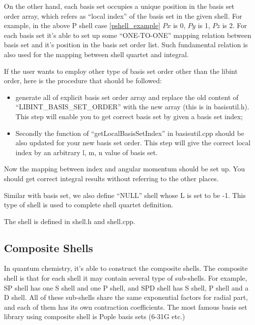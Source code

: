 On the other hand, each basis set occupies a unique position in the 
basis set order array, which refers as ``local index'' of the 
basis set in the given shell. For example, in the above P shell
case \ref{pshell_example} $Px$ is 0, $Py$ is 1, $Pz$ is 2. For 
each basis set it's able to set up some ``ONE-TO-ONE'' mapping 
relation between basis set and it's position in the basis set 
order list. Such fundamental relation is also used for the 
mapping between shell quartet and integral.

If the user wants to employ other type of basis set order other 
than the libint order, here is the procedure that should be 
followed:
\begin{itemize}
 \item generate all of explicit basis set order array and 
	 replace the old content of ``LIBINT\_BASIS\_SET\_ORDER''
	 with the new array (this is in basisutil.h). This step
	 will enable you to get correct basis set by given 
	 a basis set index;
 \item Secondly the function of ``getLocalBasisSetIndex'' in
	 basisutil.cpp should be also updated for your new basis 
	 set order. This step will give the correct local index
	 by an arbitrary l, m, n value of basis set.
\end{itemize}
Now the mapping between index and angular momentum should be 
set up. You should get correct integral results without 
referring to the other places.

Similar with basis set, we also define ``NULL'' shell whose 
L is set to be -1. This type of shell is used to complete 
shell quartet definition.

The shell is defined in shell.h and shell.cpp.

\subsection{Composite Shells}
%
%
\label{composite_shell}
%
%
In quantum chemistry, it's able to construct the composite shells.
The composite shell is that for each shell it may contain several
type of sub-shells. For example, SP shell has one S shell and one 
P shell, and SPD shell has S shell, P shell and a D shell. All of 
these sub-shells share the same exponential factors for radial part,
and each of them has its own contraction coefficients. The most
famous basis set library using composite shell is Pople basis 
sets (6-31G etc.)

